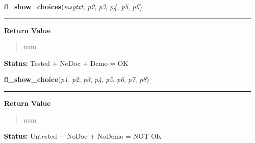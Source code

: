 \hspace{.8\funcindent}\begin{boxedminipage}{\funcwidth}

    \raggedright \textbf{fl\_show\_choices}(\textit{msgtxt}, \textit{p2}, \textit{p3}, \textit{p4}, \textit{p5}, \textit{p6})

    \vspace{-1.5ex}

    \rule{\textwidth}{0.5\fboxrule}
\setlength{\parskip}{2ex}
\setlength{\parskip}{1ex}
      \textbf{Return Value}
    \vspace{-1ex}

      \begin{quote}
      num

      \end{quote}

\textbf{Status:} Tested + NoDoc + Demo = OK



    \end{boxedminipage}

    \label{xformslib:library:fl_show_choice}

    \vspace{0.5ex}

\hspace{.8\funcindent}\begin{boxedminipage}{\funcwidth}

    \raggedright \textbf{fl\_show\_choice}(\textit{p1}, \textit{p2}, \textit{p3}, \textit{p4}, \textit{p5}, \textit{p6}, \textit{p7}, \textit{p8})

    \vspace{-1.5ex}

    \rule{\textwidth}{0.5\fboxrule}
\setlength{\parskip}{2ex}
\setlength{\parskip}{1ex}
      \textbf{Return Value}
    \vspace{-1ex}

      \begin{quote}
      num

      \end{quote}

\textbf{Status:} Untested + NoDoc + NoDemo = NOT OK



    \end{boxedminipage}

    \label{xformslib:library:fl_hide_choice}

